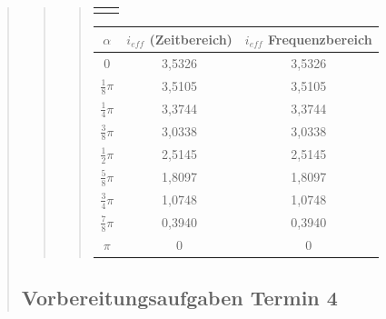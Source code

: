 \begin{quote}
\begin{quote}
\begin{quote}
\begin{center}
\begin{tabular}{ll}
\begin{minipage}{0.6\textwidth}
                    \end{minipage}
    
                \end{tabular}
                \end{center}
                 \begin{center}
                     \begin{tabular}{|c|c|c|}
                                 
                       \hline
                       $\alpha $ & $i_{eff}$ (Zeitbereich) & $i_{eff}$ Frequenzbereich\\ \hline
                       $0$ & 3,5326 & 3,5326 \\ \hline
                       $\frac{1}{8} \pi$ & 3,5105 & 3,5105 \\ \hline
                       $\frac{1}{4} \pi$ & 3,3744 & 3,3744 \\ \hline
                       $\frac{3}{8} \pi$ & 3,0338 & 3,0338 \\ \hline
                       $\frac{1}{2} \pi$ & 2,5145 & 2,5145 \\ \hline
                       $\frac{5}{8} \pi$ & 1,8097 & 1,8097 \\ \hline
                       $\frac{3}{4} \pi$ & 1,0748 & 1,0748 \\ \hline
                       $\frac{7}{8} \pi$ & 0,3940 & 0,3940 \\ \hline
                       $ \pi$ & 0 & 0 \\ \hline
                             
               
                     \end{tabular}
                 \end{center}        
        \end{quote}
    \end{quote}
    \subsection{Vorbereitungsaufgaben Termin 4}
    \begin{quote}
        
    \end{quote}
\end{quote}


